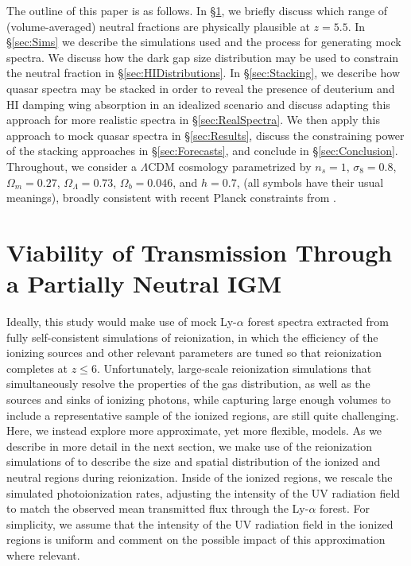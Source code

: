 The outline of this paper is as follows. In \S\ref{sec:Viability}, we briefly discuss which range of (volume-averaged) neutral fractions are physically plausible at $z=5.5$. In 
\S \ref{sec:Sims} we describe the simulations used and the process for generating mock spectra. We discuss how the dark gap size distribution may be used to constrain the neutral fraction in \S \ref{sec:HIDistributions}. In \S \ref{sec:Stacking}, we describe how quasar spectra may be stacked in order to reveal the presence of deuterium and HI damping wing absorption in an idealized scenario and discuss adapting this approach for more realistic spectra in \S \ref{sec:RealSpectra}. We then apply this approach to mock quasar spectra in \S \ref{sec:Results}, discuss the constraining power of the stacking approaches in \S \ref{sec:Forecasts}, and conclude in \S \ref{sec:Conclusion}. Throughout, we consider a $\Lambda$CDM cosmology parametrized by $n_{s} = 1$, $\sigma_{8} = 0.8$, $\Omega_{m} = 0.27$, $\Omega_{\Lambda} = 0.73$, $\Omega_{b} = 0.046$, and $h = 0.7$, (all symbols have their usual meanings), broadly consistent with recent Planck constraints from \cite{Ade:2013zuv}.


\section{Viability of Transmission Through a Partially Neutral IGM} \label{sec:Viability}

 
 Ideally, this study would make use of mock Ly-$\alpha$ forest spectra extracted from fully self-consistent simulations of reionization, in which the efficiency of the ionizing sources and other relevant parameters are tuned so that reionization completes at $z \leq 6$.
 Unfortunately, large-scale reionization simulations that simultaneously resolve the properties of the gas distribution, as well as the sources and sinks of ionizing photons, while
 capturing large enough volumes to include a representative sample of the ionized regions, are still quite challenging. Here, we instead explore more approximate, yet more flexible, models.
 As we describe in more detail in the next section, we make use of the reionization simulations of \citet{McQuinn:2007dy} to describe the size  and spatial distribution of the ionized and
 neutral regions during reionization. Inside of the ionized regions, we rescale the simulated photoionization rates, adjusting the intensity of the UV radiation field to match the observed mean transmitted flux through the Ly-$\alpha$ forest.
 For simplicity, we assume  that the intensity of the UV radiation field in the ionized regions is uniform and comment on the possible impact of this approximation where relevant.
 

